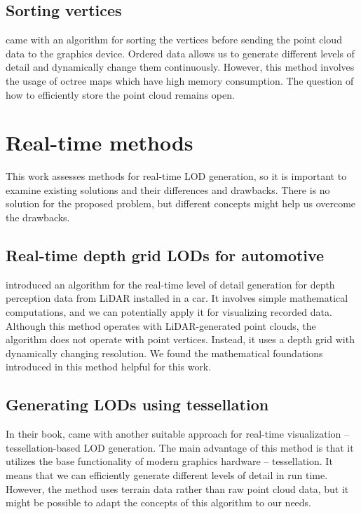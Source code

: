 \subsection{Sorting vertices}

\textcite{Evans2013} came with an algorithm for sorting the vertices before sending the point cloud data to the graphics device. Ordered data allows us to generate different levels of detail and dynamically change them continuously. However, this method involves the usage of octree maps which have high memory consumption. The question of how to efficiently store the point cloud remains open.


\section{Real-time methods}

This work assesses methods for real-time LOD generation, so it is important to examine existing solutions and their differences and drawbacks. There is no solution for the proposed problem, but different concepts might help us overcome the drawbacks.

\subsection{Real-time depth grid LODs for automotive}

\textcite{Schmid2010} introduced an algorithm for the real-time level of detail generation for depth perception data from LiDAR installed in a car. It involves simple mathematical computations, and we can potentially apply it for visualizing recorded data. Although this method operates with LiDAR-generated point clouds, the algorithm does not operate with point vertices. Instead, it uses a depth grid with dynamically changing resolution. We found the mathematical foundations introduced in this method helpful for this work.

\subsection{Generating LODs using tessellation}

In their book, \textcite{Malik2000} came with another suitable approach for real-time visualization – tessellation-based LOD generation. The main advantage of this method is that it utilizes the base functionality of modern graphics hardware – tessellation. It means that we can efficiently generate different levels of detail in run time. However, the method uses terrain data rather than raw point cloud data, but it might be possible to adapt the concepts of this algorithm to our needs.


